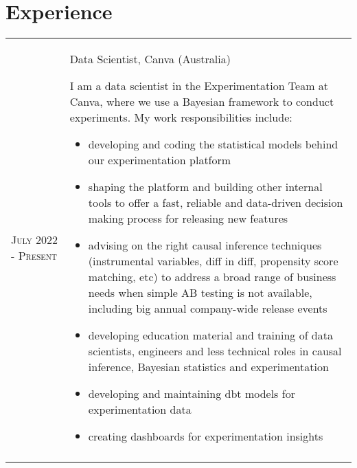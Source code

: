 \documentclass[letterpaper,9pt]{article} %
\begin{document}


\section{Experience}

\begin{tabular}{>{\raggedleft\arraybackslash}p{}|p{}}
	\textsc{July 2022 - Present} & Data Scientist, Canva (Australia) \newline \footnotesize{I am a data scientist in the Experimentation Team at Canva, where we use a Bayesian framework to conduct experiments. My work responsibilities include:
		\begin{itemize} 
			\item developing and coding the statistical models behind our experimentation platform
			\item shaping the platform and building other internal tools to offer a fast, reliable and data-driven decision making process for releasing new features
			\item advising on the right causal inference techniques (instrumental variables, diff in diff, propensity score matching, etc) to address a broad range of business needs when simple AB testing is not available, including big annual company-wide release events
			\item developing education material and training of data scientists, engineers and less technical roles in causal inference, Bayesian statistics and experimentation
			\item developing and maintaining dbt models for experimentation data
			\item creating dashboards for experimentation insights
	\end{itemize}} 	\\
	
	& \\
	

\end{tabular}
\end{document}
